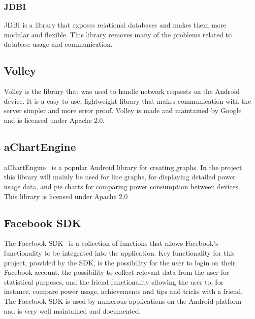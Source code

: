 \subsubsection{JDBI}
JDBI is a library that exposes relational databases and makes them more modular and flexible. This library removes many of the problems related to database usage and communication.

\subsection{Volley}
Volley is the library that was used to handle network requests on the Android device. It is a easy-to-use, lightweight library that makes communication with the server simpler and more error proof.  Volley is made and maintained by Google and is licensed under Apache 2.0.

\subsection{aChartEngine}
aChartEngine~\cite{achart} is a popular Android library for creating graphs. In the project this library will mainly be used for line graphs, for displaying detailed power usage data, and pie charts for comparing power consumption between devices. This library is licensed under Apache 2.0

\subsection{Facebook SDK}
The Facebook SDK~\cite{fsdk} is a collection of functions that allows Facebook’s functionality to be integrated into the application. Key functionality for this project, provided by the SDK, is the possibility for the user to login on their Facebook account, the possibility to collect relevant data from the user for statistical purposes, and the friend functionality allowing the user to, for instance, compare power usage, achievements and tips and tricks with a friend. The Facebook SDK is used by numerous applications on the Android platform and is very well maintained and documented. 
